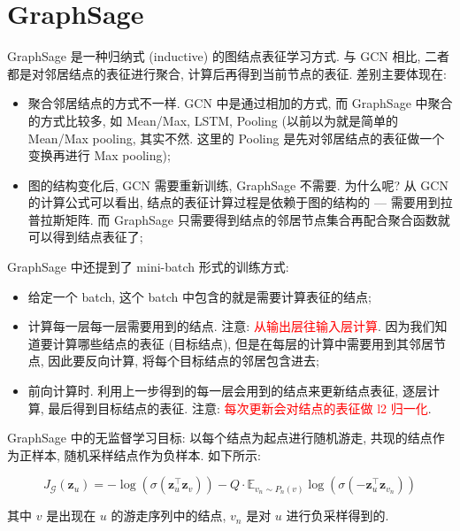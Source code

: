 \section{GraphSage}
GraphSage 是一种归纳式 (inductive) 的图结点表征学习方式. 与 GCN 相比, 二者都是对邻居结点的表征进行聚合, 计算后再得到当前节点的表征. 差别主要体现在:
\begin{itemize}
	\item 聚合邻居结点的方式不一样. GCN 中是通过相加的方式, 而 GraphSage 中聚合的方式比较多, 如 Mean/Max, LSTM, Pooling (以前以为就是简单的 Mean/Max pooling, 其实不然. 这里的 Pooling 是先对邻居结点的表征做一个变换再进行 Max pooling);
	
	\item 图的结构变化后, GCN 需要重新训练, GraphSage 不需要. 为什么呢? 从 GCN 的计算公式可以看出, 结点的表征计算过程是依赖于图的结构的 --- 需要用到拉普拉斯矩阵. 而 GraphSage 只需要得到结点的邻居节点集合再配合聚合函数就可以得到结点表征了;
\end{itemize}

GraphSage 中还提到了 mini-batch 形式的训练方式:
\begin{itemize}
	\item 给定一个 batch, 这个 batch 中包含的就是需要计算表征的结点;
	
	\item 计算每一层每一层需要用到的结点. 注意: \textcolor{red}{从输出层往输入层计算}. 因为我们知道要计算哪些结点的表征 (目标结点), 但是在每层的计算中需要用到其邻居节点, 因此要反向计算, 将每个目标结点的邻居包含进去;
	
	\item 前向计算时. 利用上一步得到的每一层会用到的结点来更新结点表征, 逐层计算, 最后得到目标结点的表征. 注意: \textcolor{red}{每次更新会对结点的表征做 l2 归一化}.
\end{itemize}

GraphSage 中的无监督学习目标: 以每个结点为起点进行随机游走, 共现的结点作为正样本, 随机采样结点作为负样本. 如下所示:

$$
J_{\mathcal{G}}\left(\mathbf{z}_u\right)=-\log \left(\sigma\left(\mathbf{z}_u^{\top} \mathbf{z}_v\right)\right)-Q \cdot \mathbb{E}_{v_n \sim P_n(v)} \log \left(\sigma\left(-\mathbf{z}_u^{\top} \mathbf{z}_{v_n}\right)\right)
$$

其中 $v$ 是出现在 $u$ 的游走序列中的结点, $v_n$ 是对 $u$ 进行负采样得到的.